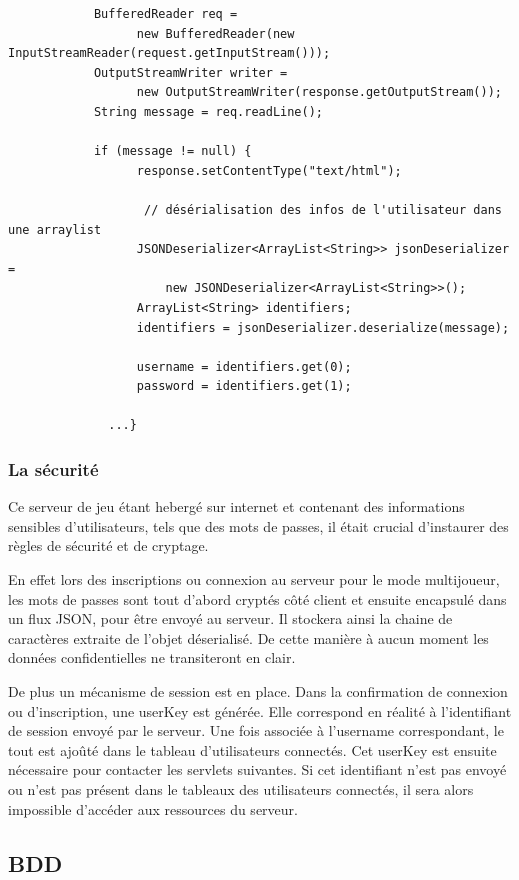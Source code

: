 		\begin{verbatim}
			BufferedReader req = 
				  new BufferedReader(new InputStreamReader(request.getInputStream()));
			OutputStreamWriter writer = 
				  new OutputStreamWriter(response.getOutputStream());
			String message = req.readLine();
			
			if (message != null) {
				  response.setContentType("text/html");
				
				   // désérialisation des infos de l'utilisateur dans une arraylist 
				  JSONDeserializer<ArrayList<String>> jsonDeserializer = 
					  new JSONDeserializer<ArrayList<String>>();
				  ArrayList<String> identifiers;
				  identifiers = jsonDeserializer.deserialize(message);
				
				  username = identifiers.get(0);
				  password = identifiers.get(1);
				  
			  ...}
		\end{verbatim}
		
		
	\subsubsection{La sécurité}
	
		Ce serveur de jeu étant hebergé sur internet et contenant des informations
		sensibles d'utilisateurs, tels que des mots de passes, il était crucial
		d'instaurer des règles de sécurité et de cryptage. 
		
		En effet lors des inscriptions ou connexion au serveur pour le mode
		multijoueur, les mots de passes sont tout d'abord cryptés côté client et
		ensuite encapsulé dans un flux JSON, pour être envoyé au serveur. Il stockera
		ainsi la chaine de caractères extraite de l'objet déserialisé. De cette
		manière à aucun moment les données confidentielles ne transiteront en clair.
		
		De plus un mécanisme de session est en place. Dans la confirmation de
		connexion ou d'inscription, une userKey est générée. Elle correspond en
		réalité à l'identifiant de session envoyé par le serveur. Une fois associée
		à l'username correspondant, le tout est ajoûté dans le tableau d'utilisateurs
		connectés.
		Cet userKey est ensuite nécessaire pour contacter les servlets suivantes. Si
		cet identifiant n'est pas envoyé ou n'est pas présent dans le tableaux des
		utilisateurs connectés, il sera alors impossible d'accéder aux ressources du
		serveur.
		
\subsection{BDD}

